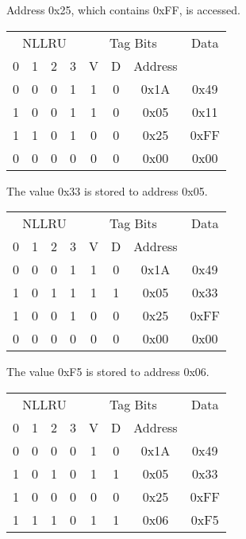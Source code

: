 Address 0x25, which contains 0xFF, is accessed.

\vspace{6pt}\noindent
\begin{tabular}{|c|c|c|c|c|c|c|c|}
  \hline
  \multicolumn{4}{|c|}{NLLRU} & \multicolumn{3}{|c|}{Tag Bits} & Data \\
  0 & 1 & 2 & 3 & V & D & Address & \\ \hline
  0 & 0 & 0 & 1 & 1 & 0 & 0x1A & 0x49 \\
  1 & 0 & 0 & 1 & 1 & 0 & 0x05 & 0x11 \\
  1 & 1 & 0 & 1 & 0 & 0 & 0x25 & 0xFF \\
  0 & 0 & 0 & 0 & 0 & 0 & 0x00 & 0x00 \\
  \hline
\end{tabular}
\vspace{6pt}

The value 0x33 is stored to address 0x05.

\vspace{6pt}\noindent
\begin{tabular}{|c|c|c|c|c|c|c|c|}
  \hline
  \multicolumn{4}{|c|}{NLLRU} & \multicolumn{3}{|c|}{Tag Bits} & Data \\
  0 & 1 & 2 & 3 & V & D & Address & \\ \hline
  0 & 0 & 0 & 1 & 1 & 0 & 0x1A & 0x49 \\
  1 & 0 & 1 & 1 & 1 & 1 & 0x05 & 0x33 \\
  1 & 0 & 0 & 1 & 0 & 0 & 0x25 & 0xFF \\
  0 & 0 & 0 & 0 & 0 & 0 & 0x00 & 0x00 \\
  \hline
\end{tabular}
\vspace{6pt}

The value 0xF5 is stored to address 0x06.

\vspace{6pt}\noindent
\begin{tabular}{|c|c|c|c|c|c|c|c|}
  \hline
  \multicolumn{4}{|c|}{NLLRU} & \multicolumn{3}{|c|}{Tag Bits} & Data \\
  0 & 1 & 2 & 3 & V & D & Address & \\ \hline
  0 & 0 & 0 & 0 & 1 & 0 & 0x1A & 0x49 \\
  1 & 0 & 1 & 0 & 1 & 1 & 0x05 & 0x33 \\
  1 & 0 & 0 & 0 & 0 & 0 & 0x25 & 0xFF \\
  1 & 1 & 1 & 0 & 1 & 1 & 0x06 & 0xF5 \\
  \hline
\end{tabular}
\vspace{6pt}

